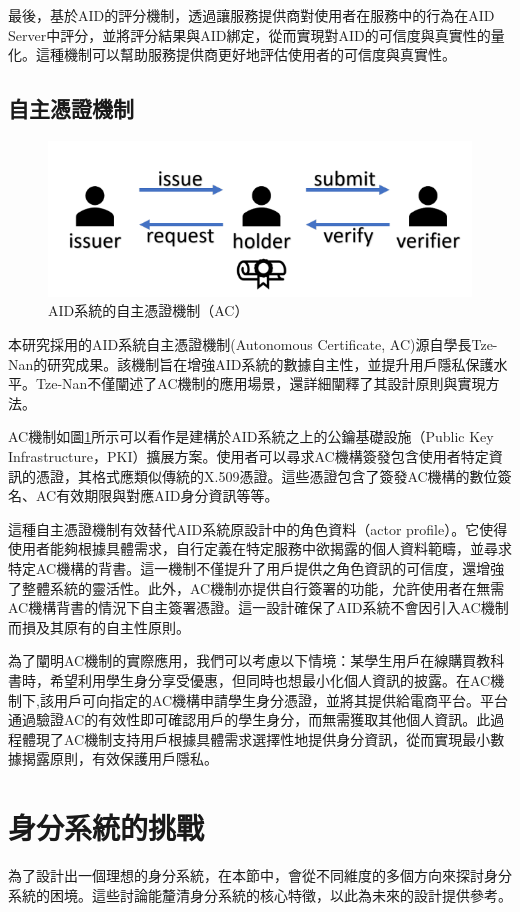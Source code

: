 最後，基於AID的評分機制，透過讓服務提供商對使用者在服務中的行為在AID Server中評分，並將評分結果與AID綁定，從而實現對AID的可信度與真實性的量化。這種機制可以幫助服務提供商更好地評估使用者的可信度與真實性。
\subsection{自主憑證機制}
\begin{figure}
  \centering
  \includegraphics[width=\linewidth,keepaspectratio]{figures/old-AC.png}
  \caption{AID系統的自主憑證機制（AC）}
  \label{fig:old-ac}
\end{figure}
本研究採用的AID系統自主憑證機制(Autonomous Certificate, AC)源自學長Tze-Nan\cite{NTU202102846}的研究成果。該機制旨在增強AID系統的數據自主性，並提升用戶隱私保護水平。Tze-Nan不僅闡述了AC機制的應用場景，還詳細闡釋了其設計原則與實現方法。

AC機制如圖\ref{fig:old-ac}所示可以看作是建構於AID系統之上的公鑰基礎設施（Public Key Infrastructure，PKI）擴展方案。使用者可以尋求AC機構簽發包含使用者特定資訊的憑證，其格式應類似傳統的X.509憑證\cite{itu-t-rec-x509}。這些憑證包含了簽發AC機構的數位簽名、AC有效期限與對應AID身分資訊等等。

這種自主憑證機制有效替代AID系統原設計中的角色資料（actor profile）。它使得使用者能夠根據具體需求，自行定義在特定服務中欲揭露的個人資料範疇，並尋求特定AC機構的背書。這一機制不僅提升了用戶提供之角色資訊的可信度，還增強了整體系統的靈活性。此外，AC機制亦提供自行簽署的功能，允許使用者在無需AC機構背書的情況下自主簽署憑證。這一設計確保了AID系統不會因引入AC機制而損及其原有的自主性原則。

為了闡明AC機制的實際應用，我們可以考慮以下情境：某學生用戶在線購買教科書時，希望利用學生身分享受優惠，但同時也想最小化個人資訊的披露。在AC機制下,該用戶可向指定的AC機構申請學生身分憑證，並將其提供給電商平台。平台通過驗證AC的有效性即可確認用戶的學生身分，而無需獲取其他個人資訊。此過程體現了AC機制支持用戶根據具體需求選擇性地提供身分資訊，從而實現最小數據揭露原則，有效保護用戶隱私。
\section{身分系統的挑戰}
為了設計出一個理想的身分系統，在本節中，會從不同維度的多個方向來探討身分系統的困境。這些討論能釐清身分系統的核心特徵，以此為未來的設計提供參考。
